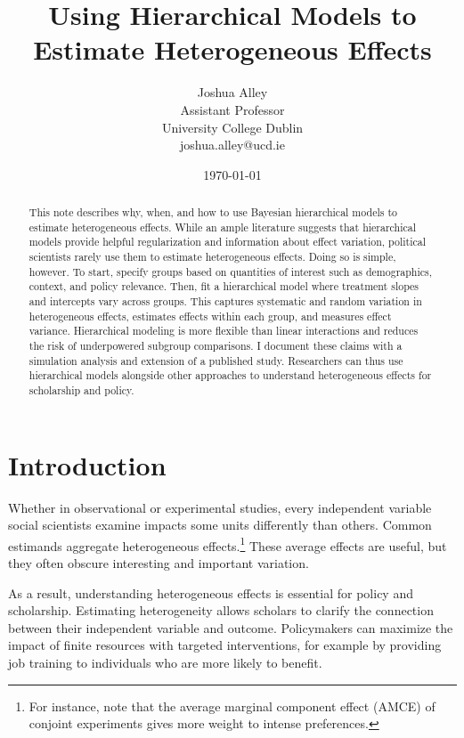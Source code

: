 \documentclass[12pt]{article}
\title{\textbf{Using Hierarchical Models to Estimate Heterogeneous Effects}}
\author{Joshua Alley \\
Assistant Professor \\
University College Dublin \\
joshua.alley@ucd.ie
}
\date{\today}
\begin{document}
\maketitle 

\begin{abstract} 
This note describes why, when, and how to use Bayesian hierarchical models to estimate heterogeneous effects. 
While an ample literature suggests that hierarchical models provide helpful regularization and information about effect variation, political scientists rarely use them to estimate heterogeneous effects. 
Doing so is simple, however. 
To start, specify groups based on quantities of interest such as demographics, context, and policy relevance.  
Then, fit a hierarchical model where treatment slopes and intercepts vary across groups.
This captures systematic and random variation in heterogeneous effects, estimates effects within each group, and measures effect variance. 
Hierarchical modeling is more flexible than linear interactions and reduces the risk of underpowered subgroup comparisons.
I document these claims with a simulation analysis and extension of a published study. 
Researchers can thus use hierarchical models alongside other approaches to understand heterogeneous effects for scholarship and policy.
\end{abstract} 


\newpage 
\doublespace 


\section{Introduction}


Whether in observational or experimental studies, every independent variable social scientists examine impacts some units differently than others. 
Common estimands aggregate heterogeneous effects.\footnote{For instance, \citet{Abramsonetal2022} note that the average marginal component effect (AMCE) of conjoint experiments gives more weight to intense preferences.} 
These average effects are useful, but they often obscure interesting and important variation. 


As a result, understanding heterogeneous effects is essential for policy and scholarship. 
Estimating heterogeneity allows scholars to clarify the connection between their independent variable and outcome.
Policymakers can maximize the impact of finite resources with targeted interventions, for example by providing job training to individuals who are more likely to benefit. 
\end{document}
